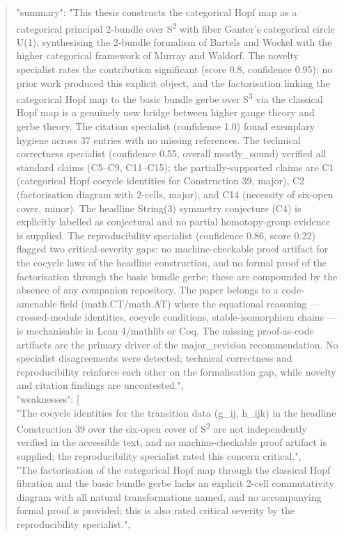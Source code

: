 \documentclass[11pt]{article}
\begin{document}
\begin{quote}
  "summary": "This thesis constructs the categorical Hopf map as a categorical principal 2-bundle over S\textsuperscript{2} with fiber Ganter's categorical circle U(1), synthesising the 2-bundle formalism of Bartels and Wockel with the higher categorical framework of Murray and Waldorf. The novelty specialist rates the contribution significant (score 0.8, confidence 0.95): no prior work produced this explicit object, and the factorisation linking the categorical Hopf map to the basic bundle gerbe over S\textsuperscript{3} via the classical Hopf map is a genuinely new bridge between higher gauge theory and gerbe theory. The citation specialist (confidence 1.0) found exemplary hygiene across 37 entries with no missing references. The technical correctness specialist (confidence 0.55, overall mostly\_sound) verified all standard claims (C5--C9, C11--C15); the partially-supported claims are C1 (categorical Hopf cocycle identities for Construction 39, major), C2 (factorisation diagram with 2-cells, major), and C14 (necessity of six-open cover, minor). The headline String(3) symmetry conjecture (C4) is explicitly labelled as conjectural and no partial homotopy-group evidence is supplied. The reproducibility specialist (confidence 0.86, score 0.22) flagged two critical-severity gaps: no machine-checkable proof artifact for the cocycle laws of the headline construction, and no formal proof of the factorisation through the basic bundle gerbe; these are compounded by the absence of any companion repository. The paper belongs to a code-amenable field (math.CT/math.AT) where the equational reasoning --- crossed-module identities, cocycle conditions, stable-isomorphism chains --- is mechanisable in Lean 4/mathlib or Coq. The missing proof-as-code artifacts are the primary driver of the major\_revision recommendation. No specialist disagreements were detected; technical correctness and reproducibility reinforce each other on the formalisation gap, while novelty and citation findings are uncontested.",\\
  "weaknesses": [\\
    "The cocycle identities for the transition data (g\_ij, h\_ijk) in the headline Construction 39 over the six-open cover of S\textsuperscript{2} are not independently verified in the accessible text, and no machine-checkable proof artifact is supplied; the reproducibility specialist rated this concern critical.",\\
    "The factorisation of the categorical Hopf map through the classical Hopf fibration and the basic bundle gerbe lacks an explicit 2-cell commutativity diagram with all natural transformations named, and no accompanying formal proof is provided; this is also rated critical severity by the reproducibility specialist.",\\

\end{quote}
\end{document}
